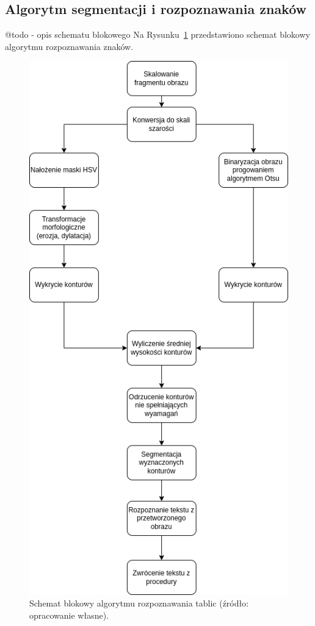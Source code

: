\subsection{Algorytm segmentacji i rozpoznawania znaków}
@todo - opis schematu blokowego
Na Rysunku~\ref{fig:characters_alg} przedstawiono schemat blokowy algorytmu rozpoznawania znaków.
\begin{figure}[!ht]
    \centering
    \includegraphics[scale=0.4]{Pictures/characters_alg}
    \caption{Schemat blokowy algorytmu rozpoznawania tablic (źródło: opracowanie własne).}
    \label{fig:characters_alg}
\end{figure}
